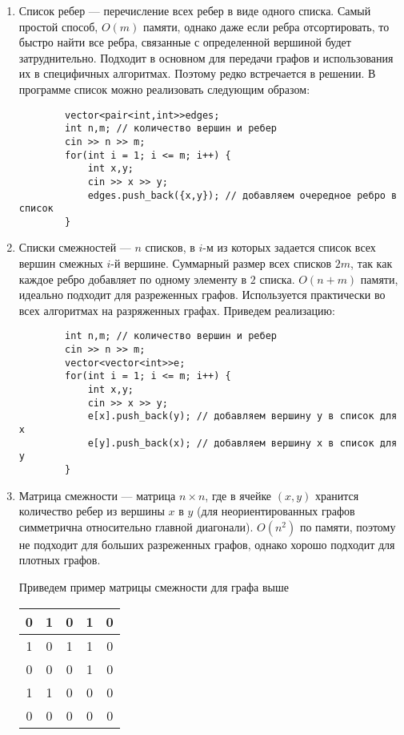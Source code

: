 \documentclass{article}
\begin{document}
\begin{enumerate}
    \item Список ребер --- перечисление всех ребер в виде одного списка. Самый простой способ, $O(m)$ памяти, однако даже если ребра отсортировать, то быстро найти все ребра, связанные с определенной вершиной будет затруднительно. Подходит в основном для передачи графов и использования их в специфичных алгоритмах. Поэтому редко встречается в решении. 
    В программе список можно реализовать следующим образом:  
    \begin{verbatim}
        vector<pair<int,int>>edges;
        int n,m; // количество вершин и ребер
        cin >> n >> m;
        for(int i = 1; i <= m; i++) {
            int x,y;
            cin >> x >> y;
            edges.push_back({x,y}); // добавляем очередное ребро в список
        }
    \end{verbatim}
    \item Списки смежностей --- $n$ списков, в $i$-м из которых задается список всех вершин смежных $i$-й вершине. Суммарный размер всех списков $2m$, так как каждое ребро добавляет по одному элементу в $2$ списка. $O(n+m)$ памяти, идеально подходит для разреженных графов. Используется практически во всех алгоритмах на разряженных графах. Приведем реализацию:
    \begin{verbatim}
        int n,m; // количество вершин и ребер
        cin >> n >> m;
        vector<vector<int>>e;
        for(int i = 1; i <= m; i++) {
            int x,y;
            cin >> x >> y;
            e[x].push_back(y); // добавляем вершину y в список для x
            e[y].push_back(x); // добавляем вершину x в список для y
        }
    \end{verbatim}
    \item Матрица смежности — матрица $n \times n$, где в ячейке $(x, y)$ хранится количество ребер из вершины $x$ в $y$ (для неориентированных графов симметрична относительно главной диагонали). $O(n^2)$ по памяти, поэтому не подходит для больших разреженных графов, однако хорошо подходит для плотных графов.
    \begin{center}
    Приведем пример матрицы смежности для графа выше
    
    \begin{tabular}{ |c|c|c|c|c| } 
     \hline
     0 & 1 & 0 & 1 & 0  \\ 
     \hline
     1 & 0 & 1 & 1 & 0  \\
     \hline
     0 & 0 & 0 & 1 & 0  \\
     \hline
     1 & 1 & 0 & 0 & 0  \\
     \hline
     0 & 0 & 0 & 0 & 0  \\
     \hline
    \end{tabular}
    \end{center}
    

\end{enumerate}
\end{document}
